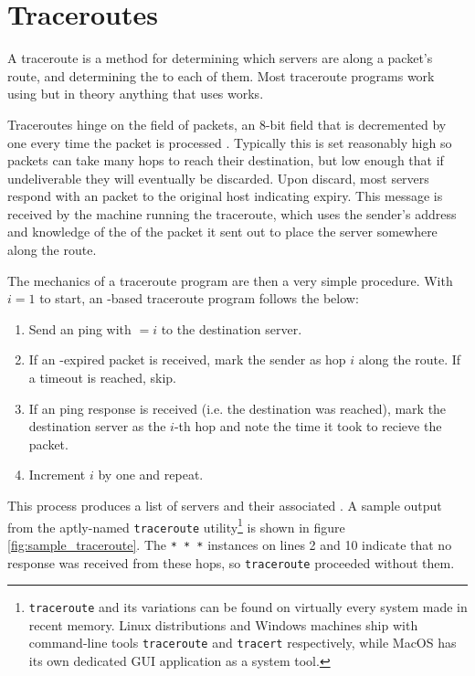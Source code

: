 \section{Traceroutes}\label{sec:background_traceroutes}

A traceroute is a method for determining which servers are along a packet's route, and determining the \rtt to each of them. Most traceroute programs work using \icmp but in theory anything that uses \ip works.

Traceroutes hinge on the \ttl field of \ip packets, an 8-bit field that is decremented by one every time the packet is processed \cite{rfc791}. Typically this is set reasonably high so packets can take many hops to reach their destination, but low enough that if undeliverable they will eventually be discarded. Upon discard, most servers respond with an \icmp packet to the original host indicating \ttl expiry. This message is received by the machine running the traceroute, which uses the sender's \ip address and knowledge of the \ttl of the packet it sent out to place the server somewhere along the route.

The mechanics of a traceroute program are then a very simple procedure. With $i=1$ to start, an \icmp-based traceroute program follows the below:

\begin{enumerate}
    \item Send an \icmp ping with \TTL$=i$ to the destination server.
    \item If an \icmp \ttl-expired packet is received, mark the sender as hop $i$ along the route. If a timeout is reached, skip.
    \item If an \icmp ping response is received (i.e. the destination was reached), mark the destination server as the $i$-th hop and note the time it took to recieve the packet.
    \item Increment $i$ by one and repeat.
\end{enumerate}

This process produces a list of servers and their associated \rtts. A sample output from the aptly-named \texttt{traceroute} utility\footnote{\texttt{traceroute} and its variations can be found on virtually every system made in recent memory. Linux distributions and Windows machines ship with command-line tools \texttt{traceroute} and \texttt{tracert} respectively, while MacOS has its own dedicated GUI application as a system tool.} is shown in figure \ref{fig:sample_traceroute}. The \texttt{* * *} instances on lines 2 and 10 indicate that no response was received from these hops, so \texttt{traceroute} proceeded without them.

